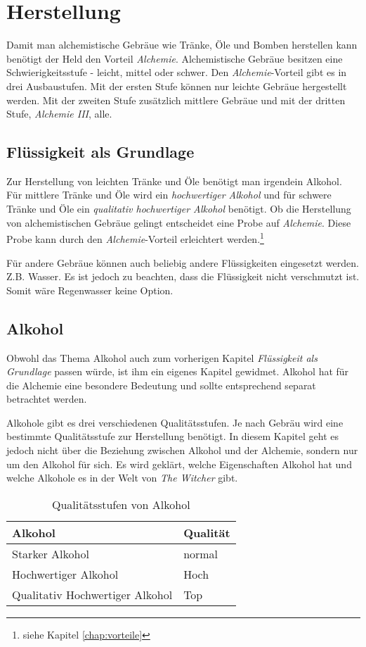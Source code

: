 \section{Herstellung}
Damit man alchemistische Gebräue wie Tränke, Öle und Bomben herstellen kann benötigt der Held den Vorteil \textit{Alchemie}. Alchemistische Gebräue besitzen eine Schwierigkeitsstufe - leicht, mittel oder schwer. Den \textit{Alchemie}-Vorteil gibt es in drei Ausbaustufen. Mit der ersten Stufe können nur leichte Gebräue hergestellt werden. Mit der zweiten Stufe zusätzlich mittlere Gebräue und mit der dritten Stufe, \textit{Alchemie III}, alle. 

\subsection{Flüssigkeit als Grundlage}
\label{chap:fluessigkeit_als_grundlage}
Zur Herstellung von leichten Tränke und Öle benötigt man irgendein Alkohol. Für mittlere Tränke und Öle wird ein \textit{hochwertiger Alkohol} und für schwere Tränke und Öle ein \textit{qualitativ hochwertiger Alkohol} benötigt. Ob die Herstellung von alchemistischen Gebräue gelingt entscheidet eine Probe auf \textit{Alchemie}. Diese Probe kann durch den \textit{Alchemie}-Vorteil erleichtert werden.\footnote{siehe Kapitel \ref{chap:vorteile}}

Für andere Gebräue können auch beliebig andere Flüssigkeiten eingesetzt werden. Z.B. Wasser. Es ist jedoch zu beachten, dass die Flüssigkeit nicht verschmutzt ist. Somit wäre Regenwasser keine Option. 

\subsection{Alkohol}
Obwohl das Thema Alkohol auch zum vorherigen Kapitel \textit{Flüssigkeit als Grundlage} passen würde, ist ihm ein eigenes Kapitel gewidmet. Alkohol hat für die Alchemie eine besondere Bedeutung und sollte entsprechend separat betrachtet werden.

Alkohole gibt es drei verschiedenen Qualitätsstufen. Je nach Gebräu wird eine bestimmte Qualitätsstufe zur Herstellung benötigt. In diesem Kapitel geht es jedoch nicht über die Beziehung zwischen Alkohol und der Alchemie, sondern nur um den Alkohol für sich. Es wird geklärt, welche Eigenschaften Alkohol hat und welche Alkohole es in der Welt von \textit{The Witcher} gibt.

\begin{table}[h]
\begin{center}
\begin{tabular}{|l|l|}
\hline
\textbf{Alkohol} & \textbf{Qualität} \\ \hline
Starker Alkohol & normal \\ \hline
Hochwertiger Alkohol & Hoch \\ \hline
Qualitativ Hochwertiger Alkohol & Top \\ \hline
\end{tabular}
\end{center}
\caption{Qualitätsstufen von Alkohol}
\label{tab:qualitaetsstufen_von_alkohol}
\end{table}

